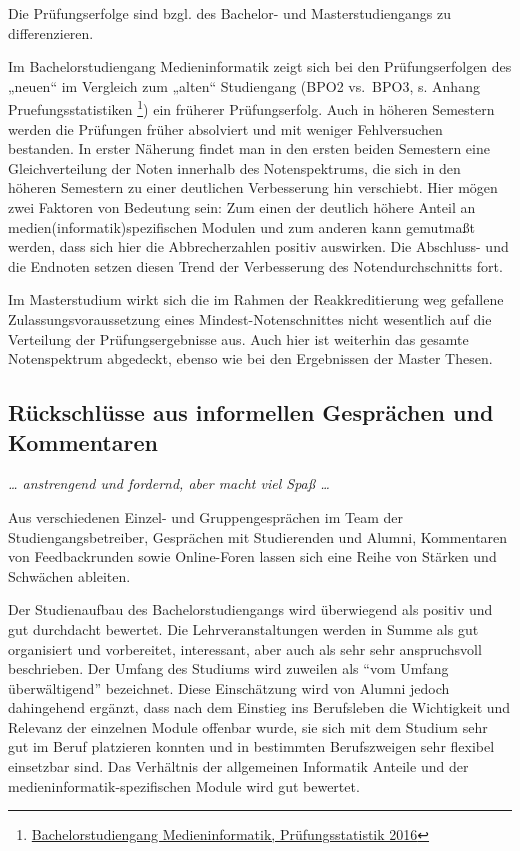 Die Prüfungserfolge sind bzgl. des Bachelor- und Masterstudiengangs zu
differenzieren.

Im Bachelorstudiengang Medieninformatik zeigt sich bei den
Prüfungserfolgen des „neuen`` im Vergleich zum „alten`` Studiengang
(BPO2 vs.~BPO3, s. Anhang Pruefungsstatistiken \footnote{\href{https://th-koeln.github.io/mi-2017/anhaenge/ba-pruefungsstatistiken.pdf}{Bachelorstudiengang
  Medieninformatik, Prüfungsstatistik 2016}}) ein früherer
Prüfungserfolg. Auch in höheren Semestern werden die Prüfungen früher
absolviert und mit weniger Fehlversuchen bestanden. In erster Näherung
findet man in den ersten beiden Semestern eine Gleichverteilung der
Noten innerhalb des Notenspektrums, die sich in den höheren Semestern zu
einer deutlichen Verbesserung hin verschiebt. Hier mögen zwei Faktoren
von Bedeutung sein: Zum einen der deutlich höhere Anteil an
medien(informatik)spezifischen Modulen und zum anderen kann gemutmaßt
werden, dass sich hier die Abbrecherzahlen positiv auswirken. Die
Abschluss- und die Endnoten setzen diesen Trend der Verbesserung des
Notendurchschnitts fort.

Im Masterstudium wirkt sich die im Rahmen der Reakkreditierung weg
gefallene Zulassungsvoraussetzung eines Mindest-Notenschnittes nicht
wesentlich auf die Verteilung der Prüfungsergebnisse aus. Auch hier ist
weiterhin das gesamte Notenspektrum abgedeckt, ebenso wie bei den
Ergebnissen der Master Thesen.

\subsection{Rückschlüsse aus informellen Gesprächen und
Kommentaren\label{/mi-2017/selbstbericht/0100-ist-zustand/0100-ist-zustand}}\label{ruxfcckschluxfcsse-aus-informellen-gespruxe4chen-und-kommentarenpathlabelmi-2017selbstbericht0100-ist-zustand0100-ist-zustand}

\emph{\ldots{} anstrengend und fordernd, aber macht viel Spaß \ldots{}}

Aus verschiedenen Einzel- und Gruppengesprächen im Team der
Studiengangsbetreiber, Gesprächen mit Studierenden und Alumni,
Kommentaren von Feedbackrunden sowie Online-Foren lassen sich eine Reihe
von Stärken und Schwächen ableiten.

Der Studienaufbau des Bachelorstudiengangs wird überwiegend als positiv
und gut durchdacht bewertet. Die Lehrveranstaltungen werden in Summe als
gut organisiert und vorbereitet, interessant, aber auch als sehr sehr
anspruchsvoll beschrieben. Der Umfang des Studiums wird zuweilen als
``vom Umfang überwältigend'' bezeichnet. Diese Einschätzung wird von
Alumni jedoch dahingehend ergänzt, dass nach dem Einstieg ins
Berufsleben die Wichtigkeit und Relevanz der einzelnen Module offenbar
wurde, sie sich mit dem Studium sehr gut im Beruf platzieren konnten und
in bestimmten Berufszweigen sehr flexibel einsetzbar sind. Das
Verhältnis der allgemeinen Informatik Anteile und der
medieninformatik-spezifischen Module wird gut bewertet.

